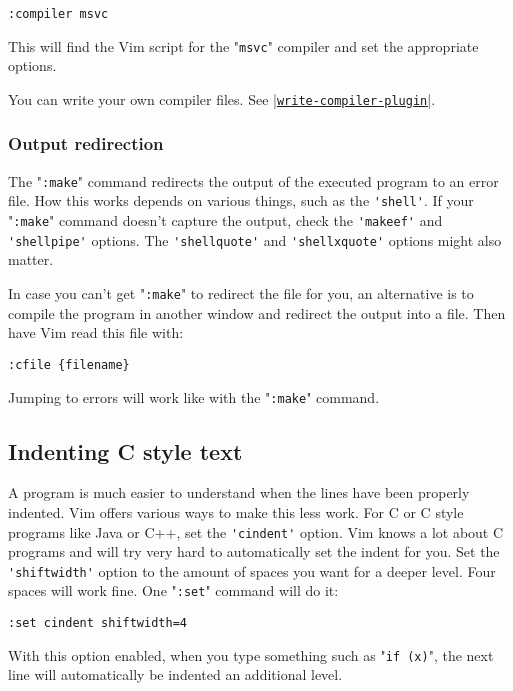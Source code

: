 \begin{Verbatim}[samepage=true]
 :compiler msvc
\end{Verbatim}

This will find the Vim script for the "\verb!msvc!" compiler and set the appropriate options.

You can write your own compiler files.  See \hyperref[write-compiler-plugin]{|\texttt{write-compiler-plugin}|}.

\subsubsection{Output redirection}
The "\verb!:make!" command redirects the output of the executed program to an error file.
How this works depends on various things, such as the \verb!'shell'!.
If your "\verb!:make!" command doesn't capture the output, check the \verb!'makeef'! and \verb!'shellpipe'! options.
The \verb!'shellquote'! and \verb!'shellxquote'! options might also matter.

In case you can't get "\verb!:make!" to redirect the file for you, an alternative is to compile the program in another window and redirect the output into a file.
Then have Vim read this file with:

\begin{Verbatim}[samepage=true]
 :cfile {filename}
\end{Verbatim}

Jumping to errors will work like with the "\verb!:make!" command.
\subsection{Indenting C style text}
A program is much easier to understand when the lines have been properly indented.
Vim offers various ways to make this less work.
For C or C style programs like Java or C++, set the \verb!'cindent'! option.
Vim knows a lot about C programs and will try very hard to automatically set the indent for you.
Set the \verb!'shiftwidth'! option to the amount of spaces you want for a deeper level.
Four spaces will work fine.
One "\verb!:set!" command will do it:

\begin{Verbatim}[samepage=true]
 :set cindent shiftwidth=4
\end{Verbatim}

With this option enabled, when you type something such as "\verb!if (x)!", the next line will automatically be indented an additional level.

